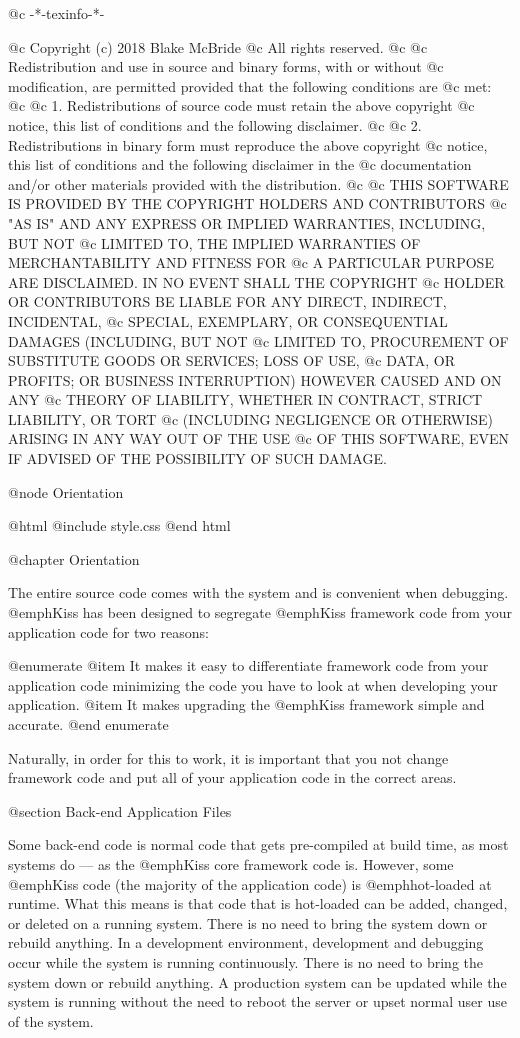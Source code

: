 @c -*-texinfo-*-

@c  Copyright (c) 2018 Blake McBride
@c  All rights reserved.
@c
@c  Redistribution and use in source and binary forms, with or without
@c  modification, are permitted provided that the following conditions are
@c  met:
@c
@c  1. Redistributions of source code must retain the above copyright
@c  notice, this list of conditions and the following disclaimer.
@c
@c  2. Redistributions in binary form must reproduce the above copyright
@c  notice, this list of conditions and the following disclaimer in the
@c  documentation and/or other materials provided with the distribution.
@c
@c  THIS SOFTWARE IS PROVIDED BY THE COPYRIGHT HOLDERS AND CONTRIBUTORS
@c  "AS IS" AND ANY EXPRESS OR IMPLIED WARRANTIES, INCLUDING, BUT NOT
@c  LIMITED TO, THE IMPLIED WARRANTIES OF MERCHANTABILITY AND FITNESS FOR
@c  A PARTICULAR PURPOSE ARE DISCLAIMED. IN NO EVENT SHALL THE COPYRIGHT
@c  HOLDER OR CONTRIBUTORS BE LIABLE FOR ANY DIRECT, INDIRECT, INCIDENTAL,
@c  SPECIAL, EXEMPLARY, OR CONSEQUENTIAL DAMAGES (INCLUDING, BUT NOT
@c  LIMITED TO, PROCUREMENT OF SUBSTITUTE GOODS OR SERVICES; LOSS OF USE,
@c  DATA, OR PROFITS; OR BUSINESS INTERRUPTION) HOWEVER CAUSED AND ON ANY
@c  THEORY OF LIABILITY, WHETHER IN CONTRACT, STRICT LIABILITY, OR TORT
@c  (INCLUDING NEGLIGENCE OR OTHERWISE) ARISING IN ANY WAY OUT OF THE USE
@c  OF THIS SOFTWARE, EVEN IF ADVISED OF THE POSSIBILITY OF SUCH DAMAGE.


@node Orientation

@html
@include style.css
@end html

@chapter Orientation


The entire source code comes with the system and is convenient when
debugging.  @emph{Kiss} has been designed to segregate @emph{Kiss}
framework code from your application code for two reasons:

@enumerate
@item
It makes it easy to differentiate framework code from your application code minimizing
the code you have to look at when developing your application.
@item
It makes upgrading the @emph{Kiss} framework simple and accurate.
@end enumerate

Naturally, in order for this to work, it is important that you not change framework code
and put all of your application code in the correct areas.

@section Back-end Application Files

Some back-end code is normal code that gets pre-compiled at build time,
as most systems do --- as the @emph{Kiss} core framework code is.
However, some @emph{Kiss} code (the majority of the application code)
is @emph{hot-loaded} at runtime.  What this means is that code that is
hot-loaded can be added, changed, or deleted on a running system.  
There is no need to bring the system down or rebuild anything. In a development
environment, development and debugging occur while the system is
running continuously.  There is no need to bring the system down or rebuild
anything.  A production system can be updated while the system is
running without the need to reboot the server or upset normal user use
of the system.


